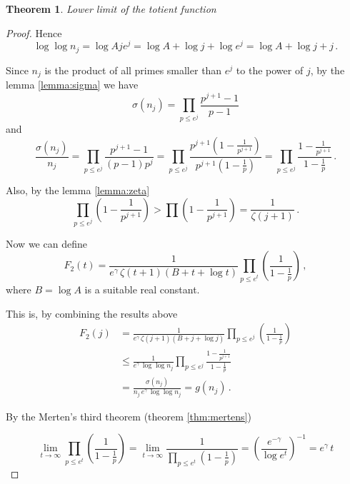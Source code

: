 \documentclass{article}
\theoremstyle{definition}
\newtheorem{theorem}[subsubsection]{Theorem}
\begin{document}
\begin{theorem}{\emph{Lower limit of the totient function}}
\begin{proof}
Hence
\begin{equation*}
\label{eq:lognj}
    \log \log n_j = \log Aje^j = \log A + \log j + \log e^j = \log A + \log j + j\,.
\end{equation*}

Since $n_j$ is the product of all primes smaller than $e^j$ to the power of $j$, by the lemma \ref{lemma:sigma} we have
\begin{equation*}
    \sigma(n_j) = \prod_{p\leq e^j} \frac{p^{j+1}-1}{p-1}
\end{equation*}
and
\begin{equation*}
    \frac{\sigma(n_j)}{n_j} = \prod_{p\leq e^j} \frac{p^{j+1}-1}{(p-1)p^j} = \prod_{p\leq e^j} \frac{p^{j+1}\left(1-\frac{1}{p^{j+1}}\right)}{p^{j+1}\left(1-\frac{1}{p}\right)} = \prod_{p\leq e^j} \frac{1-\frac{1}{p^{j+1}}}{1-\frac{1}{p}}\,.
\end{equation*}

Also, by the lemma \ref{lemma:zeta}
\begin{equation*}
    \prod_{p\leq e^j}\left(1-\frac{1}{p^{j+1}}\right) > \prod \left(1-\frac{1}{p^{j+1}}\right) = \frac{1}{\zeta(j+1)}\,.
\end{equation*}

Now we can define
\begin{equation*}
    F_2(t)=\frac{1}{e^\gamma\,\zeta(t+1)(B+t+\log t)} \prod_{p\leq e^t} \left(\frac{1}{1-\frac{1}{p}}\right)\,,
\end{equation*}
where $B=\log A$ is a suitable real constant.

This is, by combining the results above
\begin{align*}
    F_2(j)& = \frac{1}{e^\gamma\,\zeta(j+1)(B+j+\log j)} \prod_{p\leq e^j} \left(\frac{1}{1-\frac{1}{p}}\right)\\
    & \leq \frac{1}{e^\gamma\,\log \log n_j} \prod_{p\leq e^j} \frac{1-\frac{1}{p^{j+1}}}{1-\frac{1}{p}}\\
    & = \frac{\sigma(n_j)}{n_j\,e^\gamma\,\log \log n_j} = g(n_j)\,.
\end{align*}

By the Merten's third theorem (theorem \ref{thm:mertens})

\begin{equation*}
    \lim_{t \rightarrow \infty} \prod_{p\leq e^t} \left(\frac{1}{1-\frac{1}{p}}\right) = \lim_{t \rightarrow \infty} \frac{1}{\prod_{p\leq e^t} \left(1-\frac{1}{p}\right)} = \left(\frac{e^{-\gamma}}{\log e^t}\right)^{-1} = e^\gamma\,t
\end{equation*}


\end{proof}
\end{theorem}
\end{document}
